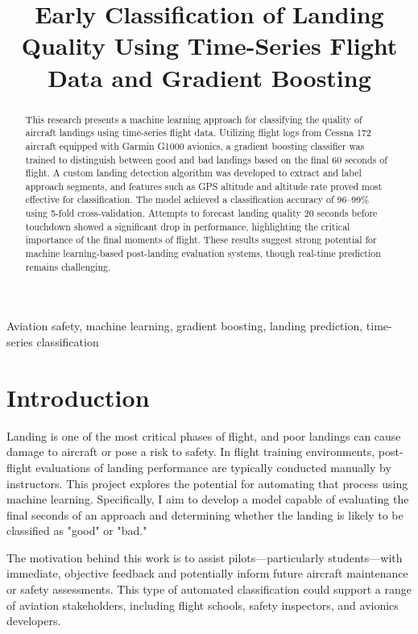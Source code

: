 \documentclass[conference]{IEEEtran}
\title{Early Classification of Landing Quality Using Time-Series Flight Data and Gradient Boosting}
\author{\IEEEauthorblockN{Nathan Johnson}
\IEEEauthorblockA{\textit{Embry-Riddle Aeronautical University} \\
Prescott, Arizona, USA \\
nathan.johnson@erau.edu}}
\begin{document}
\maketitle

\begin{abstract}
This research presents a machine learning approach for classifying the quality of aircraft landings using time-series flight data. Utilizing flight logs from Cessna 172 aircraft equipped with Garmin G1000 avionics, a gradient boosting classifier was trained to distinguish between good and bad landings based on the final 60 seconds of flight. A custom landing detection algorithm was developed to extract and label approach segments, and features such as GPS altitude and altitude rate proved most effective for classification. The model achieved a classification accuracy of 96–99\% using 5-fold cross-validation. Attempts to forecast landing quality 20 seconds before touchdown showed a significant drop in performance, highlighting the critical importance of the final moments of flight. These results suggest strong potential for machine learning-based post-landing evaluation systems, though real-time prediction remains challenging.
\end{abstract}

\begin{IEEEkeywords}
Aviation safety, machine learning, gradient boosting, landing prediction, time-series classification
\end{IEEEkeywords}

\section{Introduction}
Landing is one of the most critical phases of flight, and poor landings can cause damage to aircraft or pose a risk to safety. In flight training environments, post-flight evaluations of landing performance are typically conducted manually by instructors. This project explores the potential for automating that process using machine learning. Specifically, I aim to develop a model capable of evaluating the final seconds of an approach and determining whether the landing is likely to be classified as "good" or "bad."

The motivation behind this work is to assist pilots—particularly students—with immediate, objective feedback and potentially inform future aircraft maintenance or safety assessments. This type of automated classification could support a range of aviation stakeholders, including flight schools, safety inspectors, and avionics developers.
\end{document}
